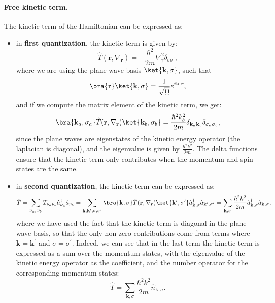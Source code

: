\paragraph{Free kinetic term.}
The kinetic term of the Hamiltonian can be expressed as:
\begin{itemize}
    \item in \textbf{first quantization}, the kinetic term is given by:
          \[
              \hat{T}(\mathbf{r}, \nabla_{\mathbf{r}}) = -\frac{\hbar^2}{2m} \nabla^2_{\mathbf{r}} \delta_{\sigma \sigma'},
          \]
          where we are using the plane wave basis \(\ket{\mathbf{k}, \sigma}\), such that
          \[
              \bra{\mathbf{r}}\ket{\mathbf{k}, \sigma} = \frac{1}{\sqrt{\Omega}} e^{i \mathbf{k} \cdot \mathbf{r}},
          \]
          and if we compute the matrix element of the kinetic term, we get:
          \[
              \bra{\mathbf{k}_a, \sigma_a} \hat{T}(\mathbf{r}, \nabla_{\mathbf{r}}) \ket{\mathbf{k}_b, \sigma_b} = \frac{\hbar^2 k_b^2}{2m} \delta_{\mathbf{k}_a \mathbf{k}_b} \delta_{\sigma_a \sigma_b},
          \]
          since the plane waves are eigenstates of the kinetic energy operator (the laplacian is diagonal), and the eigenvalue is given by \(\frac{\hbar^2 k^2}{2m}\). The delta functions ensure that the kinetic term only contributes when the momentum and spin states are the same.
    \item in \textbf{second quantization}, the kinetic term can be expressed as:
          \[
              \hat{T} = \sum_{\nu_a,\,\nu_b} T_{\nu_a \nu_b} \hat{a}_{\nu_a}^\dagger \hat{a}_{\nu_b} = \sum_{\mathbf{k}, \mathbf{k}^{\prime}, \sigma, \sigma^{\prime}} \bra{\mathbf{k}, \sigma} \hat{T}(\mathbf{r}, \nabla_{\mathbf{r}}) \ket{\mathbf{k}^{\prime}, \sigma^{\prime}} \hat{a}_{\mathbf{k}, \sigma}^\dagger \hat{a}_{\mathbf{k}^{\prime}, \sigma^{\prime}} = \sum_{\mathbf{k}, \sigma} \frac{\hbar^2 k^2}{2m} \hat{a}_{\mathbf{k}, \sigma}^\dagger \hat{a}_{\mathbf{k}, \sigma},
          \]
          where we have used the fact that the kinetic term is diagonal in the plane wave basis, so that the only non-zero contributions come from terms where \(\mathbf{k} = \mathbf{k}^{\prime}\) and \(\sigma = \sigma^{\prime}\). Indeed, we can see that in the last term the kinetic term is expressed as a sum over the momentum states, with the eigenvalue of the kinetic energy operator as the coefficient, and the number operator for the corresponding momentum states:
          \[
              \hat{T} = \sum_{\mathbf{k}, \sigma} \frac{\hbar^2 k^2}{2m} \hat{n}_{\mathbf{k}, \sigma}.
          \]
\end{itemize}

